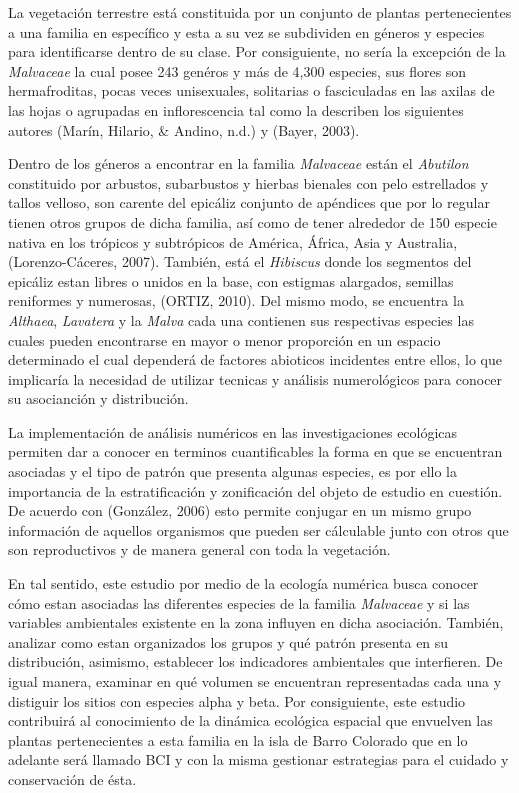 \documentclass[11pt,]{article}
\begin{document}
La vegetación terrestre está constituida por un conjunto de plantas
pertenecientes a una familia en específico y esta a su vez se subdividen
en géneros y especies para identificarse dentro de su clase. Por
consiguiente, no sería la excepción de la \emph{Malvaceae} la cual posee
243 genéros y más de 4,300 especies, sus flores son hermafroditas, pocas
veces unisexuales, solitarias o fasciculadas en las axilas de las hojas
o agrupadas en inflorescencia tal como la describen los siguientes
autores (Marín, Hilario, \& Andino, n.d.) y (Bayer, 2003).

Dentro de los géneros a encontrar en la familia \emph{Malvaceae} están
el \emph{Abutilon} constituido por arbustos, subarbustos y hierbas
bienales con pelo estrellados y tallos velloso, son carente del epicáliz
conjunto de apéndices que por lo regular tienen otros grupos de dicha
familia, así como de tener alrededor de 150 especie nativa en los
trópicos y subtrópicos de América, África, Asia y Australia,
(Lorenzo-Cáceres, 2007). También, está el \emph{Hibiscus} donde los
segmentos del epicáliz estan libres o unidos en la base, con estigmas
alargados, semillas reniformes y numerosas, (ORTIZ, 2010). Del mismo
modo, se encuentra la \emph{Althaea}, \emph{Lavatera} y la \emph{Malva}
cada una contienen sus respectivas especies las cuales pueden
encontrarse en mayor o menor proporción en un espacio determinado el
cual dependerá de factores abioticos incidentes entre ellos, lo que
implicaría la necesidad de utilizar tecnicas y análisis numerológicos
para conocer su asocianción y distribución.

La implementación de análisis numéricos en las investigaciones
ecológicas permiten dar a conocer en terminos cuantificables la forma en
que se encuentran asociadas y el tipo de patrón que presenta algunas
especies, es por ello la importancia de la estratificación y
zonificación del objeto de estudio en cuestión. De acuerdo con
(González, 2006) esto permite conjugar en un mismo grupo información de
aquellos organismos que pueden ser cálculable junto con otros que son
reproductivos y de manera general con toda la vegetación.

En tal sentido, este estudio por medio de la ecología numérica busca
conocer cómo estan asociadas las diferentes especies de la familia
\emph{Malvaceae} y si las variables ambientales existente en la zona
influyen en dicha asociación. También, analizar como estan organizados
los grupos y qué patrón presenta en su distribución, asimismo,
establecer los indicadores ambientales que interfieren. De igual manera,
examinar en qué volumen se encuentran representadas cada una y distiguir
los sitios con especies alpha y beta. Por consiguiente, este estudio
contribuirá al conocimiento de la dinámica ecológica espacial que
envuelven las plantas pertenecientes a esta familia en la isla de Barro
Colorado que en lo adelante será llamado BCI y con la misma gestionar
estrategias para el cuidado y conservación de ésta.
\end{document}
